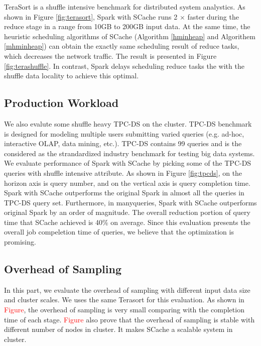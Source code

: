 TeraSort is a shuffle intensive benchmark for distributed system analystics. As shown in Figure \ref{fig:terasort}, Spark with SCache runs 2 $\times$ faster during the reduce stage in a range from 10GB to 200GB input data. At the same time, the heuristic scheduling algorithms of SCache (Algorithm \ref{hminheap} and Algorithem \ref{mhminheap}) can obtain the exactly same scheduling result of reduce tasks, which decreases the network traffic. The result is presented in Figure \ref{fig:terashuffle}. In contrast, Spark delays scheduling reduce tasks the with the shuffle data locality to achieve this optimal.

\subsection{Production Workload}

We also evalute some shuffle heavy TPC-DS\cite{tpcds} on the cluster. TPC-DS benchmark is designed for modeling multiple users submitting varied queries (e.g. ad-hoc, interactive OLAP, data mining, etc.). TPC-DS contains 99 queries and is the considered as the  strandardized industry benchmark for testing big data systems. We evaluate performance of Spark with SCache by picking some of the TPC-DS queries with shuffle intensive attribute. As shown in Figure \ref{fig:tpcds}, on the horizon axis is query number, and on the vertical axis is query completion time. Spark with SCache outperforms the original Spark in almost all the queries in TPC-DS query set. Furthermore, in manyqueries, Spark with SCache outperforms original Spark by an order of magnitude. The overall reduction portion of query time that SCache achieved is 40\% on average. Since this evaluation presents the overall job compeletion time of queries, we believe that the optimization is promising.

\subsection{Overhead of Sampling}
In this part, we evaluate the overhead of sampling with different input data size and cluster scales. We uses the same Terasort\cite{spark-tera} for this evaluation. As shown in \textcolor{red}{Figure}, the overhead of sampling is very small comparing with the completion time of each stage.  \textcolor{red}{Figure} also prove that the overhead of sampling is stable with different number of nodes in cluster. It makes SCache a scalable system in cluster.

